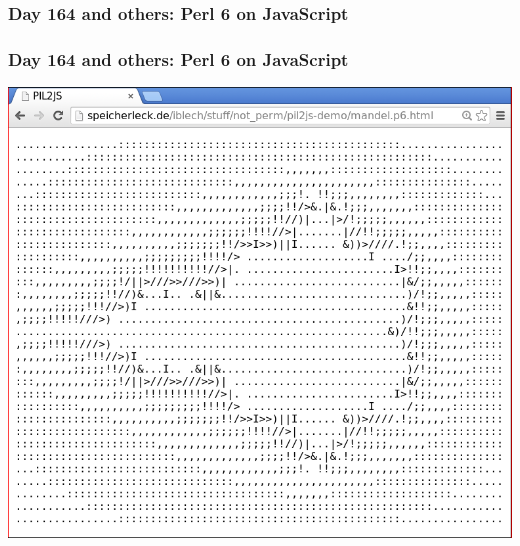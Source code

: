 \documentclass[12pt,compress,english,utf8,t]{beamer}
\newcommand{\inputminted}[2]{}
\begin{document}
\subsubsection{Day 164 and others: Perl 6 on JavaScript}
\begin{frame}[label=pil2js]\frametitle{Day 164 and others: Perl 6 on JavaScript}
  \begin{center}\includegraphics[scale=0.25]{images/mandel-in-the-browser}\end{center}

  \inputminted{perl}{code-snippets/day193-jsan.pl}
\end{frame}
\end{document}
